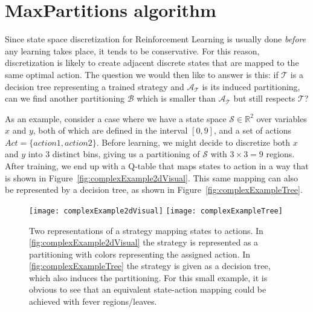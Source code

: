 \section{MaxPartitions algorithm}%
\label{sec:maxParts}

Since state space discretization for Reinforcement Learning is usually done
\textit{before} any learning takes place, it tends to be conservative. For this
reason, discretization is likely to create adjacent discrete states that are
mapped to the same optimal action. The question we would then like to answer is
this: if $\mathcal{T}$ is a decision tree representing a trained strategy and
$\mathcal{A}_{\mathcal{T}}$ is its induced partitioning, can we find another
partitioning $\mathcal{B}$ which is smaller than $\mathcal{A}_{\mathcal{T}}$ but
still respects $\mathcal{T}$?

As an example, consider a case where we have a state space $\mathcal{S} \in
\mathbb{R}^2$ over variables $x$ and $y$, both of which are defined in the
interval $[0,9]$, and a set of actions $Act = \{ action1, action2 \}$. Before
learning, we might decide to discretize both $x$ and $y$ into 3 distinct bins,
giving us a partitioning of $\mathcal{S}$ with $3\times3 = 9$ regions. After
training, we end up with a Q-table that maps states to action in a way that is
shown in Figure~\ref{fig:complexExample2dVisual}. This same mapping can also be
represented by a decision tree, as shown in Figure~\ref{fig:complexExampleTree}.

\begin{figure}[ht]
  \texttt{[image: complexExample2dVisual]}
  \label{fig:complexExample2dVisual}
  \texttt{[image: complexExampleTree]}
  \label{fig:complexExampleTree}

  \caption{%
    Two representations of a strategy mapping states to actions. In
    \cref{fig:complexExample2dVisual} the strategy is represented as a
    partitioning with colors representing the assigned action. In
    \cref{fig:complexExampleTree} the strategy is given as a decision
    tree, which also induces the partitioning. For this small example, it is
    obvious to see that an equivalent state-action mapping could be achieved
    with fever regions/leaves.
  }%
  \label{fig:complexExample}
\end{figure}

